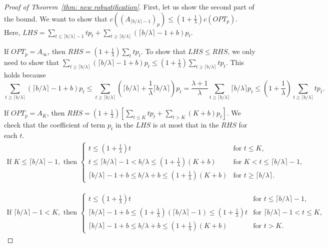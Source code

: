 \begin{proof}[Proof of Theorem~\ref{thm: new robustification}]
    First, let us show the second part of the bound. We want to show that $c((A_{\lceil b/\lambda \rceil - 1})_p) \leq (1+\frac{1}{\lambda})c(OPT_p)$. Here, $LHS=\sum _{t \leq \lceil b/\lambda \rceil - 1} tp_t + \sum_{t \geq \lceil b/\lambda  \rceil} (\lceil b/\lambda  \rceil - 1 + b)p_t$.
    
    If $OPT_p = A_\infty$, then $RHS=(1+\frac{1}{\lambda})\sum_t tp_t$. To show that $LHS \leq RHS$, we only need to show that $\sum_{t \geq \lceil b/\lambda  \rceil} (\lceil b/\lambda  \rceil - 1 + b)p_t  \leq (1+\frac{1}{\lambda})\sum_{t \geq \lceil b/\lambda  \rceil} tp_t$. This holds because
    \[\sum_{t \geq \lceil b/\lambda  \rceil} (\lceil b/\lambda  \rceil - 1 + b)p_t  \leq \sum_{t \geq \lceil b/\lambda \rceil} (\lceil b/\lambda  \rceil + \frac{1}{\lambda} \lceil b/\lambda  \rceil)p_t = \frac{\lambda+1}{\lambda} \sum_{t \geq \lceil b/\lambda  \rceil} \lceil b/\lambda  \rceil p_t \leq (1+\frac{1}{\lambda})\sum_{t \geq \lceil b/\lambda  \rceil} tp_t.\]
    
    If $OPT_p = A_K$, then $RHS=(1+\frac{1}{\lambda}) \left[ \sum_{t \leq K}tp_t + \sum_{t>K}(K+b)p_t \right]$. We check that the coefficient of term $p_t$ in the $LHS$ is at most that in the $RHS$ for each $t$. 
    \begin{align*}
    \text{If } K \leq \lceil b/\lambda  \rceil - 1, \text{ then } 
    \begin{cases}
        t \leq (1+\frac{1}{\lambda})t & \text{for } t \leq K, \\
        t \leq \lceil b/\lambda  \rceil - 1 < b/\lambda \leq (1+\frac{1}{\lambda})(K+b) & \text{for } K<t \leq \lceil b/\lambda  \rceil - 1, \\
        \lceil b/\lambda \rceil - 1 +b \leq b/\lambda + b \leq (1+\frac{1}{\lambda})(K+b) & \text{for } t \geq \lceil b/\lambda  \rceil.
    \end{cases}
    \end{align*}

    
    \begin{align*}
    \text{If } \lceil b/\lambda  \rceil - 1 < K, \text{ then } 
    \begin{cases}
        t \leq (1+\frac{1}{\lambda})t & \text{for } t \leq \lceil b/\lambda \rceil - 1, \\
        \lceil b/\lambda  \rceil - 1 + b \leq  (1+\frac{1}{\lambda})(\lceil b/\lambda  \rceil - 1) \leq (1+\frac{1}{\lambda}) t & \text{for } \lceil b/\lambda  \rceil - 1 < t \leq K, \\
        \lceil b/\lambda  \rceil - 1 + b \leq b/\lambda + b \leq  (1+\frac{1}{\lambda})(K+b) & \text{for } t >K.
    \end{cases}
    \end{align*}



\end{proof}
